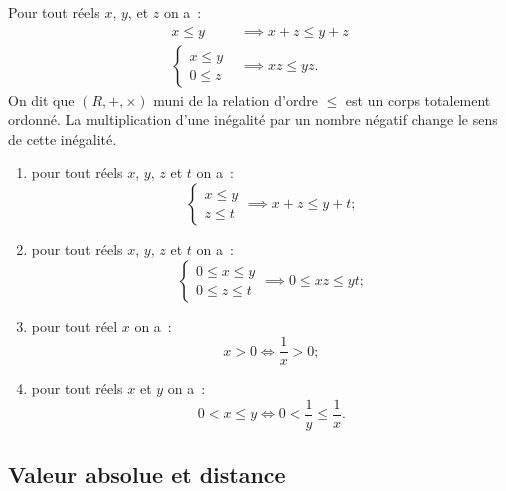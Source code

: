 \begin{prop}
  Pour tout réels \(x\), \(y\), et \(z\) on a~:
  \begin{align}
    x\leqslant y &\implies x+z\leqslant y+z \\
    \begin{cases} x\leqslant y \\ 0\leqslant z \end{cases} &\implies xz 
    \leqslant yz.
  \end{align}
  On dit que \((R,+,\times)\) muni de la relation d'ordre \(\leqslant\) est un 
  corps totalement ordonné. La multiplication d'une inégalité par un nombre 
  négatif change le sens de cette inégalité.
\end{prop}
\begin{enumerate}
  \item pour tout réels \(x\), \(y\), \(z\) et \(t\) on a~:
    \begin{equation}
      \begin{cases}x\leqslant y \\ z \leqslant t \end{cases} \implies 
      x+z\leqslant y+t;
    \end{equation}
  \item pour tout réels \(x\), \(y\), \(z\) et \(t\) on a~:
    \begin{equation}
      \begin{cases}0\leqslant x\leqslant y \\ 0 \leqslant z \leqslant t 
      \end{cases} \implies 0\leqslant xz \leqslant yt;
    \end{equation}
  \item pour tout réel \(x\) on a~:
    \begin{equation}
      x>0 \iff \frac{1}{x}>0;
    \end{equation}
  \item pour tout réels \(x\) et \(y\) on a~:
    \begin{equation}
      0<x\leqslant y \iff 0<\frac{1}{y}\leqslant \frac{1}{x}.
    \end{equation}
\end{enumerate}

\subsection{Valeur absolue et distance}

